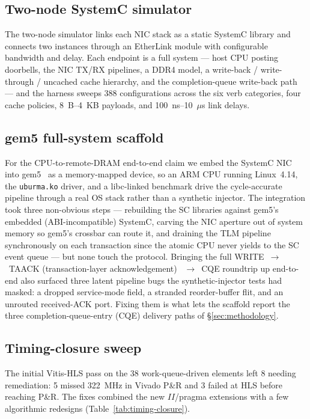 \documentclass[10pt,twocolumn]{article}
\begin{document}
\subsection{Two-node SystemC simulator}
\label{subsec:impl-twonode}

The two-node simulator links each NIC stack as a static SystemC
library and connects two instances through an EtherLink module with
configurable bandwidth and delay. Each endpoint is a full system
--- host CPU posting doorbells, the NIC TX/RX pipelines, a DDR4
model, a write-back / write-through / uncached cache hierarchy, and
the completion-queue write-back path --- and the harness sweeps 388
configurations across the six verb categories, four cache policies,
8~B--4~KB payloads, and 100~ns--10~$\mu$s link delays.

\subsection{gem5 full-system scaffold}
\label{subsec:impl-gem5}

For the CPU-to-remote-DRAM end-to-end claim we embed the SystemC
NIC into gem5~\cite{lowepower2020:gem5} as a memory-mapped device,
so an ARM CPU running Linux~4.14, the \texttt{uburma.ko} driver,
and a libc-linked benchmark drive the cycle-accurate pipeline
through a real OS stack rather than a synthetic injector. The
integration took three non-obvious steps --- rebuilding the SC
libraries against gem5's embedded (ABI-incompatible) SystemC,
carving the NIC aperture out of system memory so gem5's crossbar
can route it, and draining the TLM pipeline synchronously on each
transaction since the atomic CPU never yields to the SC event
queue --- but none touch the protocol. Bringing the full
WRITE~$\rightarrow$~TAACK (transaction-layer acknowledgement)
~$\rightarrow$~CQE roundtrip up end-to-end also surfaced three
latent pipeline bugs the synthetic-injector tests had masked: a
dropped service-mode field, a stranded reorder-buffer flit, and an
unrouted received-ACK port. Fixing them is what lets the scaffold
report the three completion-queue-entry (CQE) delivery paths of
\S\ref{sec:methodology}.

\subsection{Timing-closure sweep}
\label{subsec:impl-closure}

The initial Vitis-HLS pass on the 38 work-queue-driven elements
left 8 needing remediation: 5 missed 322~MHz in Vivado P\&R and 3
failed at HLS before reaching P\&R. The fixes combined the new
$II$/pragma extensions with a few algorithmic redesigns
(Table~\ref{tab:timing-closure}).
\end{document}

